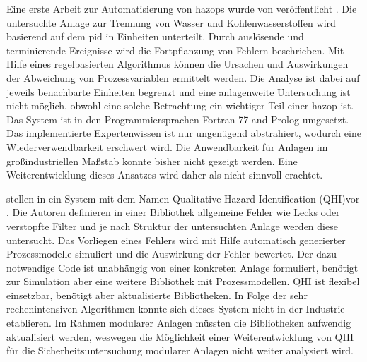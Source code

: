 Eine erste Arbeit zur Automatisierung von \acp{hazop} wurde von \citeauthor{Parmar_1987} ver\"offentlicht \cite{Parmar_1987,Parmar_1987a}. Die untersuchte Anlage zur Trennung von Wasser und Kohlenwasserstoffen wird basierend auf dem \ac{pid} in Einheiten unterteilt. Durch ausl\"osende und terminierende Ereignisse wird die Fortpflanzung von Fehlern beschrieben. Mit Hilfe eines regelbasierten Algorithmus k\"onnen die Ursachen und Auswirkungen der Abweichung von Prozessvariablen ermittelt werden. Die Analyse ist dabei auf jeweils benachbarte Einheiten begrenzt und eine anlagenweite Untersuchung ist nicht m\"oglich, obwohl eine solche Betrachtung  ein wichtiger Teil einer \ac{hazop} ist. Das System ist in den Programmiersprachen Fortran 77 and Prolog umgesetzt. Das implementierte Expertenwissen ist nur ungen\"ugend abstrahiert, wodurch eine Wiederverwendbarkeit erschwert wird. Die Anwendbarkeit f\"ur Anlagen im gro\ss{}industriellen Ma\ss{}stab konnte bisher nicht gezeigt werden. Eine Weiterentwicklung dieses Ansatzes wird daher als nicht sinnvoll erachtet.

\citeauthor{Catino_1995} stellen in  ein System mit dem Namen \glqq Qualitative Hazard Identification (QHI)\grqq { }vor \cite{Catino_1995}. Die Autoren definieren in einer Bibliothek allgemeine Fehler wie Lecks oder verstopfte Filter und je nach Struktur der untersuchten Anlage werden diese untersucht. Das Vorliegen eines Fehlers wird mit Hilfe automatisch generierter Prozessmodelle simuliert und die Auswirkung der Fehler bewertet. Der dazu notwendige Code ist unabh\"angig von einer konkreten Anlage formuliert, ben\"otigt zur Simulation aber eine weitere Bibliothek mit Prozessmodellen. QHI ist flexibel einsetzbar, ben\"otigt aber aktualisierte Bibliotheken. In Folge der sehr rechenintensiven Algorithmen konnte sich dieses System nicht in der Industrie etablieren. Im Rahmen modularer Anlagen m\"ussten die Bibliotheken aufwendig aktualisiert werden, weswegen die M\"oglichkeit einer Weiterentwicklung von QHI f\"ur die Sicherheitsuntersuchung modularer Anlagen nicht weiter analysiert wird. 

